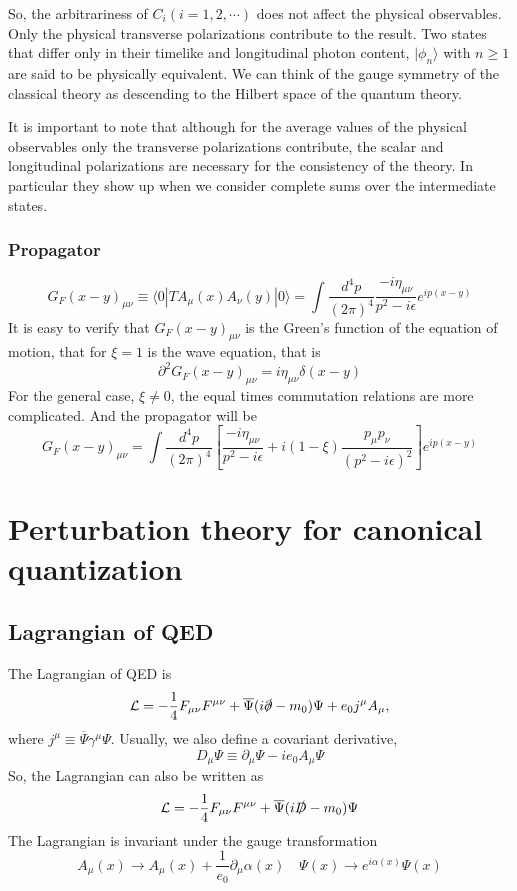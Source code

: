 So, the arbitrariness of $C_i(i=1,2,\cdots)$ does not affect the physical observables. Only the physical transverse polarizations
contribute to the result. Two states that differ only in their timelike and longitudinal photon content, $|\phi_n\rangle$ with $n \geq 1$ are said to be physically equivalent. We can think of the gauge symmetry of the classical theory as descending to the Hilbert space of the quantum theory.

It is important to note that although for the average values of the physical observables only the transverse polarizations contribute, the scalar and longitudinal polarizations are necessary for the consistency of the theory. In particular they show up when we consider complete sums over the intermediate states.

\subsubsection{Propagator}
\[G_F(x-y)_{\mu\nu} \equiv \langle 0 |T A_{\mu}(x) A_{\nu}(y) | 0 \rangle = \int \frac{d^4p}{(2\pi)^4} \frac{-i\eta_{\mu\nu}}{p^2-i\epsilon}  e^{ip(x-y)}\]
It is easy to verify that $G_F(x-y)_{\mu\nu}$ is the Green's function of the equation of motion, that for $\xi=1$ is the wave equation, that is
\[\partial^2 G_F(x-y)_{\mu\nu} = i\eta_{\mu\nu}\delta(x-y)\]
For the general case, $\xi \neq 0$, the equal times commutation relations are more complicated. And the propagator will be
\[G_F(x-y)_{\mu\nu}  = \int \frac{d^4p}{(2\pi)^4} \left[\frac{-i\eta_{\mu\nu}}{p^2-i\epsilon} + i(1-\xi)\frac{p_{\mu}p_{\nu}}{(p^2-i\epsilon)^2}\right] e^{ip(x-y)}\]

\section{Perturbation theory for canonical quantization}
\subsection{Lagrangian of QED}
\noindent
The Lagrangian of QED is
\[\mathcal{L} = -\frac{1}{4}F_{\mu\nu}F^{\mu\nu} + \overline{\Psi} (i\slashed{\partial}-m_0) \Psi + e_0j^{\mu} A_{\mu}, \]
where $j^{\mu} \equiv \overline{\Psi}\gamma^{\mu}\Psi$. Usually, we also define a covariant derivative,
\[D_{\mu}\Psi \equiv \partial_{\mu}\Psi -ie_0A_{\mu}\Psi \]
So, the Lagrangian can also be written as
\[\mathcal{L} = -\frac{1}{4}F_{\mu\nu}F^{\mu\nu} + \overline{\Psi} (i\slashed{D}-m_0) \Psi\]
The Lagrangian is invariant under the gauge transformation
\[A_{\mu}(x) \to A_{\mu}(x) + \frac{1}{e_0}\partial_{\mu}\alpha(x) \quad \Psi(x) \to e^{i\alpha(x)} \Psi(x)\]

